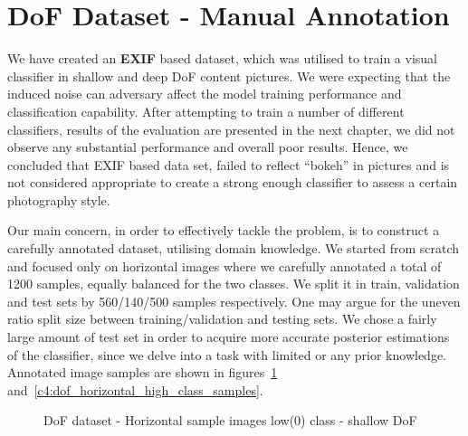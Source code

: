 \section{DoF Dataset - Manual Annotation}
\label{c4:dof_dataset}

We have created an \textbf{EXIF} based dataset, which was utilised to train a visual classifier in shallow and deep DoF content pictures. We were expecting that the induced noise can adversary affect the model training performance and classification capability. After attempting to train a number of different classifiers, results of the evaluation are presented in the next chapter, we did not observe any substantial performance and overall poor results.
Hence, we concluded that EXIF based data set, failed to reflect ``bokeh'' in pictures and is not considered appropriate to create a strong enough classifier to assess a certain photography style.

Our main concern, in order to effectively tackle the problem, is to construct a carefully annotated dataset, utilising domain knowledge.
We started from scratch and focused only on horizontal images where we carefully annotated a total of 1200 samples, equally balanced for the two classes. 
We split it in train, validation and test sets by 560/140/500 samples respectively.
One may argue for the uneven ratio split size between training/validation and testing sets. We chose a fairly large amount of test set in order to acquire more accurate posterior estimations of the classifier, since we delve into a task with limited or any prior knowledge.
Annotated image samples are shown in figures~\ref{c4:dof_horizontal_low_class_samples} and~\ref{c4:dof_horizontal_high_class_samples}.


\begin{figure}[h!]
    \centering  
    \caption{DoF dataset - Horizontal sample images low(0) class - shallow DoF}
    \label{c4:dof_horizontal_low_class_samples}
\end{figure}


